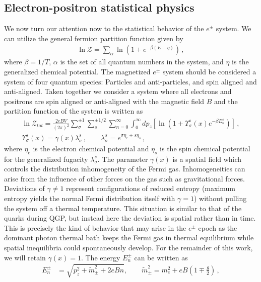 \documentclass[universe,article,submit,moreauthors,pdftex,a4paper]{Definitions/mdpi}
\begin{document}
\subsection{Electron-positron statistical physics}\label{sec:Partition}
\noindent We now turn our attention now to the statistical behavior of the $e^{\pm}$ system. We can utilize the general fermion partition function given by \cite{Elze:1980er}
\begin{align}
  \label{PartFunc} \ln\mathcal{Z}=\sum_{\alpha}\ln\left(1+e^{-\beta(E-\eta)}\right)\,,
\end{align}
where $\beta=1/T$, $\alpha$ is the set of all quantum numbers in the system, and $\eta$ is the generalized chemical potential. The magnetized $e^{\pm}$ system should be considered a system of four quantum species: Particles and anti-particles, and spin aligned and anti-aligned. Taken together we consider a system where all electrons and positrons are spin aligned or anti-aligned with the magnetic field $B$ and the partition function of the system is written as
\begin{align}
  \label{PartFuncB}\ln\mathcal{Z}_{tot}=\frac{2eBV}{(2\pi)^2}\sum_{\sigma}^{\pm1}\sum_{s}^{\pm1/2}\sum_{n=0}^\infty\int^\infty_{0}dp_z\left[\ln\left(1+\Upsilon_{\sigma}^{s}(x)e^{-\beta E_{n}^{s}}\right)\right]\,,\\
  \label{Fugacity}\Upsilon_{\sigma}^{s}(x)=\gamma(x)\lambda_{\sigma}^{s}\,,\qquad\lambda_{\sigma}^{s}=e^{\sigma\eta_{e}+s\eta_{s}}\,,
\end{align}
where $\eta_{e}$ is the electron chemical potential and $\eta_s$ is the spin chemical potential for the generalized fugacity $\lambda_{\sigma}^{s}$. The parameter $\gamma(x)$ is a spatial field which controls the distribution inhomogeneity of the Fermi gas. Inhomogeneities can arise from the influence of other forces on the gas such as gravitational forces. Deviations of $\gamma\neq1$ represent configurations of reduced entropy (maximum entropy yields the normal Fermi distribution itself with $\gamma=1$) without pulling the system off a thermal temperature. This situation is similar to that of the quarks during QGP, but instead here the deviation is spatial rather than in time. This is precisely the kind of behavior that may arise in the $e^{\pm}$ epoch as the dominant photon thermal bath keeps the Fermi gas in thermal equilibrium while spatial inequilibria could spontaneously develop. For the remainder of this work, we will retain $\gamma(x)=1$. The energy $E_{n}^\pm$ can be written as
\begin{align}
E_{n}^\pm&=\sqrt{p^2_z+\tilde m^2_\pm+2eBn},\qquad\tilde{m}^2_\pm=m^2_e+eB\left(1\mp\frac{g}{2}\right)\,,
\end{align}
\end{document}
